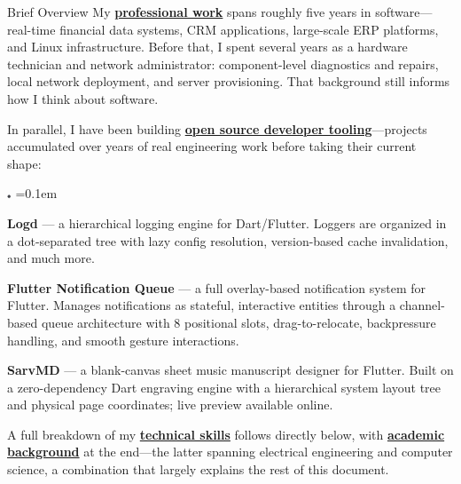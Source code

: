 \documentclass[
	a4paper, %
	12pt, %
]{resume} %
\begin{document}
\begin{rSection}{Brief Overview}
\smallskip
My \hyperlink{experience}{\textbf{professional work}} spans roughly five years in software---real-time financial data systems, CRM applications, large-scale ERP platforms, and Linux infrastructure. Before that, I spent several years as a hardware technician and network administrator: component-level diagnostics and repairs, local network deployment, and server provisioning. That background still informs how I think about software.

In parallel, I have been building \hyperlink{opensource}{\textbf{open source developer tooling}}---projects accumulated over years of real engineering work before taking their current shape:
\begin{list}{$\pdot$}{\leftmargin=12pt \itemsep=0.1em \parsep=0pt \topsep=2pt}
    \item \textbf{Logd} --- a hierarchical logging engine for Dart/Flutter. Loggers are organized in a dot-separated tree with lazy config resolution, version-based cache invalidation, and much more.
    \item \textbf{Flutter Notification Queue} --- a full overlay-based notification system for Flutter. Manages notifications as stateful, interactive entities through a channel-based queue architecture with 8 positional slots, drag-to-relocate, backpressure handling, and smooth gesture interactions.
    \item \textbf{SarvMD} --- a blank-canvas sheet music manuscript designer for Flutter. Built on a zero-dependency Dart engraving engine with a hierarchical system layout tree and physical page coordinates; live preview available online.
\end{list}

A full breakdown of my \hyperlink{skills}{\textbf{technical skills}} follows directly below, with \hyperlink{education}{\textbf{academic background}} at the end---the latter spanning electrical engineering and computer science, a combination that largely explains the rest of this document.
\end{rSection}

\end{document}
